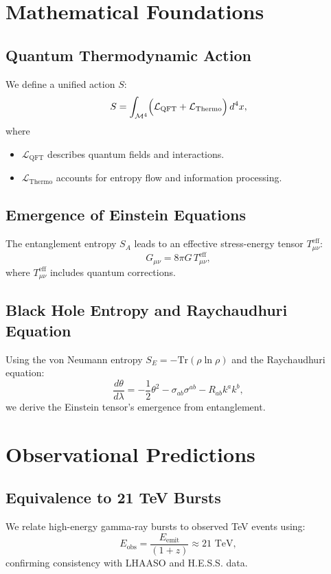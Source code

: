 \documentclass[12pt, a4paper]{article}
\begin{document}
\section{Mathematical Foundations}

\subsection{Quantum Thermodynamic Action}
We define a unified action $S$:
\begin{equation}
    S = \int_{\mathcal{M}^{4}} \Bigl( \mathcal{L}_{\text{QFT}} + \mathcal{L}_{\text{Thermo}} \Bigr) \, d^{4}x,
\end{equation}
where
\begin{itemize}
    \item $\mathcal{L}_{\text{QFT}}$ describes quantum fields and interactions.
    \item $\mathcal{L}_{\text{Thermo}}$ accounts for entropy flow and information processing.
\end{itemize}

\subsection{Emergence of Einstein Equations}
The entanglement entropy $S_A$ leads to an effective stress-energy tensor $T_{\mu\nu}^{\text{eff}}$:
\begin{equation}
    G_{\mu\nu} = 8\pi G\, T_{\mu\nu}^{\text{eff}},
\end{equation}
where $T_{\mu\nu}^{\text{eff}}$ includes quantum corrections.

\subsection{Black Hole Entropy and Raychaudhuri Equation}
Using the von Neumann entropy $S_{E} = -\text{Tr} (\rho \ln \rho)$ and the Raychaudhuri equation:
\begin{equation}
    \frac{d\theta}{d\lambda} = -\frac{1}{2} \theta^2 - \sigma_{ab} \sigma^{ab} - R_{ab} k^a k^b,
\end{equation}
we derive the Einstein tensor's emergence from entanglement.

\section{Observational Predictions}

\subsection{Equivalence to 21 TeV Bursts}
We relate high-energy gamma-ray bursts to observed TeV events using:
\begin{equation}
    E_{\text{obs}} = \frac{E_{\text{emit}}}{(1+z)} \approx 21\text{ TeV},
\end{equation}
confirming consistency with LHAASO and H.E.S.S. data.
\end{document}
